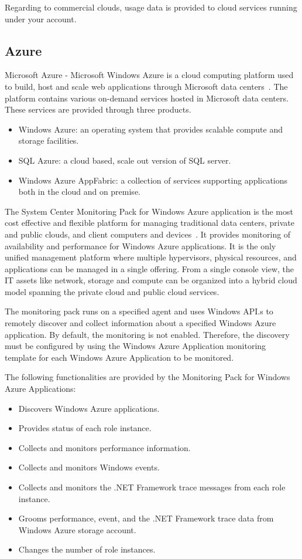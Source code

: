 \documentclass{sig-alternate}
\begin{document}
Regarding to commercial clouds, usage data is provided to cloud services running under your account.

\subsection{Azure}

Microsoft Azure - Microsoft Windows Azure is a cloud computing platform used to build, host and scale web applications through Microsoft data centers~\cite{azure11}. The platform contains various on-demand services hosted in Microsoft data centers. These services are provided through three products.

\begin{itemize}
 \item Windows Azure: an operating system that provides scalable compute and storage facilities.
 \item SQL Azure: a cloud based, scale out version of SQL server.
 \item Windows Azure AppFabric: a collection of services supporting applications both in the cloud and on premise.
\end{itemize}

The System Center Monitoring Pack for Windows Azure application is the most cost effective and flexible platform for managing traditional data centers, private and public clouds, and client computers and devices~\cite{MonitoringPackAzure11}. It provides monitoring of availability and performance for Windows Azure applications. It is the only unified management platform where multiple hypervisors, physical resources, and applications can be managed in a single offering. From a single console view, the IT assets like network, storage and compute can be organized into a hybrid cloud model spanning the private cloud and public cloud services.

The monitoring pack runs on a specified agent and uses Windows API.s to remotely discover and collect information about a specified Windows Azure application. By default, the monitoring is not enabled. Therefore, the discovery must be configured by using the Windows Azure Application monitoring template for each Windows Azure Application to be monitored.

The following functionalities are provided by the Monitoring Pack for Windows Azure Applications:

\begin{itemize}
 \item Discovers Windows Azure applications.
 \item Provides status of each role instance.
 \item Collects and monitors performance information.
 \item Collects and monitors Windows events.
 \item Collects and monitors the .NET Framework trace messages from each role instance.
 \item Grooms performance, event, and the .NET Framework trace data from Windows Azure storage account.
 \item Changes the number of role instances.
\end{itemize}
\end{document}

